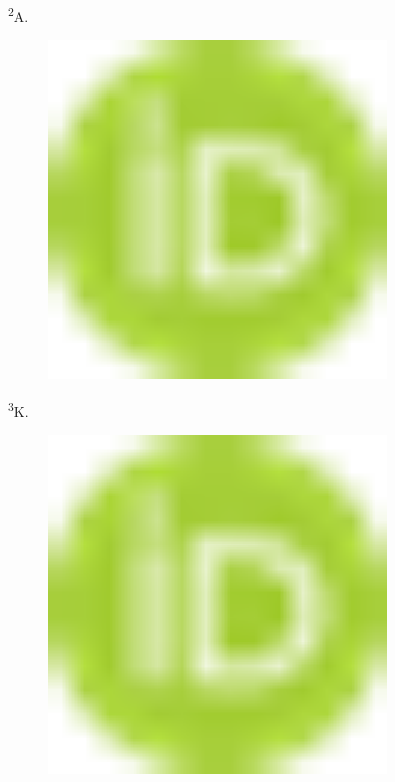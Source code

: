 {\textsuperscript{2}A.
\begin{figure}[H]
	\centering
	\includegraphics[width=0.8\textwidth]{media/ict/image1}
	\caption*{}
\end{figure}

\textsuperscript{3}K.
\begin{figure}[H]
	\centering
	\includegraphics[width=0.8\textwidth]{media/ict/image1}
	\caption*{}
\end{figure}


}
